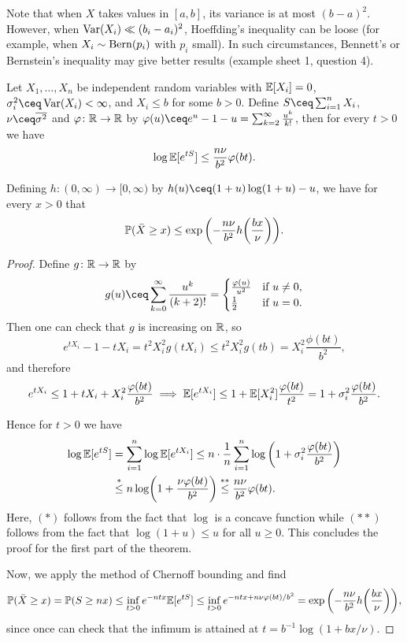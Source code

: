 \begin{example}
	Note that when $X$ takes values in $[a, b]$, its variance is at most $(b-a)^2$. However, when $\operatorname{Var}(X_i) \ll (b_i - a_i)^2$, Hoeffding's inequality can be loose (for example, when $X_i \sim \mathrm{Bern}(p_i)$ with $p_i$ small). In such circumstances, Bennett's or Bernstein's inequality may give better results (example sheet 1, question 4). 
\end{example}

\begin{theorem}
	Let $X_1, \dotsc, X_n$ be independent random variables with $\mathbb E[X_i] = 0$, $\sigma_i^2 \ceq \Var(X_i) < \infty$, and $X_i \leq b$ for some $b > 0$. Define  $S \ceq \sum_{i=1}^n X_i$, $\nu \ceq \overline{\sigma^2}$ and $\varphi \colon \mathbb R \to \mathbb R$ by $\phi(u) \ceq e^u - 1 - u = \sum_{k=2}^\infty \frac{u^k}{k!}$, then for every $t > 0$ we have
	\[
	\log\mathbb E[e^{tS}] \leq \frac{n \nu }{b^2} \varphi(bt). 
	\]
	
	Defining $h \colon (0, \infty) \to [0, \infty)$ by $h(u) \ceq (1+u)\log(1+u) - u$, we have for every $x > 0$ that
	\[
	\mathbb P(\bar X \geq x) \leq \exp\qty(-\frac{n \nu}{b^2} h\qty(\frac{bx}{\nu})). 
	\]
\end{theorem}

\begin{proof}
	Define $g \colon \mathbb R \to \mathbb R$ by 
	\[
	g(u) \ceq \sum_{k=0}^\infty \frac{u^k}{(k+2)!} = \begin{cases}
		\frac{\phi(u)}{u^2}&\text{if $u \neq 0$}, \\
		\frac12 &\text{if $u = 0$}. 
	\end{cases} 
	\]
	Then one can check that $g$ is increasing on $\mathbb R$, so 
	\[
	e^{tX_i} - 1 - t X_i = t^2 X_i^2 g(tX_i) \leq t^2 X_i^2 g(tb) = X_i^2 \frac{\phi(bt)}{b^2},
	\]
	and therefore
	\[
	e^{tX_i} \leq 1 + tX_i + X_i^2 \frac{\varphi(bt)}{b^2} \implies \mathbb E[e^{tX_i}] \leq 1 + \mathbb E[X_i^2] \frac{\varphi(bt)}{t^2} = 1 + \sigma_i^2 \frac{\varphi(bt)}{b^2}. 
	\]
	
	Hence for $t > 0$ we have
	\begin{align*}
		\log \mathbb E[e^{tS}] &= \sum_{i=1}^n \log\mathbb E[e^{tX_i}] \leq n \cdot \frac1n\sum_{i=1}^n \log\qty(1 + \sigma_i^2 \frac{\varphi(bt)}{b^2}) \\
		&\overset*\leq n \log(1 + \frac{\nu \varphi(bt)}{b^2}) \overset{**}\leq  \frac{n\nu}{b^2}\varphi(bt).
	\end{align*}
Here, $(*)$ follows from the fact that $\log$ is a concave function while $(**)$ follows from the fact that $\log(1+u) \leq u$ for all $u \geq 0$. This concludes the proof for the first part of the theorem.

Now, we apply the method of Chernoff bounding and find
\[
\mathbb P(\bar X \geq x) = \mathbb P(S \geq nx) \leq \inf_{t > 0} e^{-ntx} \mathbb E[e^{t S}] \leq \inf_{t > 0} e^{-ntx + n\nu \varphi(bt)/b^2} = \exp\qty(-\frac{n\nu}{b^2} h\qty(\frac{bx}{\nu})),
\]
since once can check that the infimum is attained at $t = b^{-1} \log(1 + bx/\nu)$. 
\end{proof}


